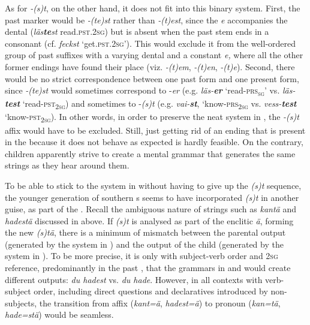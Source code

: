 \documentclass[output=paper,colorlinks,citecolor=brown,draft,draftmode]{langscibook}
\begin{document}
As for \textit{-(s)t}, on the other hand, it does not fit into this binary system. First, the past  marker would be \textit{-(te)st} rather than \textit{-(t)est}, since the \textit{e} accompanies the dental (\textit{läs\textbf{{te}}\textit{st}} read.\textsc{pst}.2\textsc{sg}) but is absent when the past  stem ends in a consonant (cf. \textit{feckst} ‘get.\textsc{pst}.2\textsc{sg}’). This would exclude it from the well-ordered group of past  suffixes with a varying dental and a constant \textit{e,} where all the other former  endings have found their place (viz. \textit{\nobreakdash-(t)em}, \textit{-(t)en}, \textit{-(t)e}). Second, there would be no strict correspondence between one past  form and one present  form, since \textit{-(te)st} would sometimes correspond to -\textit{er} (e.g. \textit{läs-\textbf{{er}}} ‘read-\textsc{prs}\textsc{\textsubscript{sg}}’ vs. \textit{läs-\textbf{{test}}} ‘read-\textsc{pst}\textsubscript{2}\textsc{\textsubscript{sg}}) and sometimes to -\textit{(s)t} (e.g. \textit{vai-\textbf{{st}}}, ‘know-\textsc{prs}\textsubscript{2}\textsc{\textsubscript{sg}} vs. \textit{vess\nobreakdash-\textbf{{test}}} ‘know-\textsc{pst}\textsubscript{2}\textsc{\textsubscript{sg}}). In other words, in order to preserve the neat system in , the \textit{-(s)t} affix would have to be excluded. Still, just getting rid of an ending that is present in the  because it does not behave as expected is hardly feasible. On the contrary, children apparently strive to create a mental grammar that generates the same strings as they hear around them.



To be able to stick to the system in  without having to give up the \textit{(s)t} sequence, the younger generation of southern s seems to have incorporated \textit{(s)t} in another guise, as part of the . Recall the ambiguous nature of strings such as \textit{kantä} and \textit{hadestä} discussed in  above. If \textit{(s)t} is analysed as part of the enclitic \textit{ä}, forming the new  \textit{(s)tä}, there is a minimum of mismatch between the parental output (generated by the system in ) and the output of the child (generated by the system in ). To be more precise, it is only with subject-verb order and 2\textsc{sg} reference, predominantly in the past , that the grammars in  and  would create different outputs: \textit{du hadest} vs. \textit{du hade}. However, in all contexts with verb-subject order, including direct questions and declaratives introduced by non-subjects, the transition from affix (\textit{kant=ä}, \textit{hadest=ä}) to pronoun (\textit{kan=tä}, \textit{hade=stä}) would be seamless.
\end{document}
